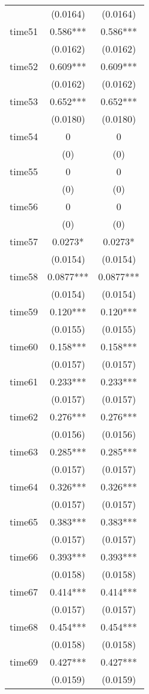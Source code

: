 \documentclass[]{article}
\begin{document}
\begin{tabular}{lcc}
 & (0.0164) & (0.0164) \\
time51 & 0.586*** & 0.586*** \\
 & (0.0162) & (0.0162) \\
time52 & 0.609*** & 0.609*** \\
 & (0.0162) & (0.0162) \\
time53 & 0.652*** & 0.652*** \\
 & (0.0180) & (0.0180) \\
time54 & 0 & 0 \\
 & (0) & (0) \\
time55 & 0 & 0 \\
 & (0) & (0) \\
time56 & 0 & 0 \\
 & (0) & (0) \\
time57 & 0.0273* & 0.0273* \\
 & (0.0154) & (0.0154) \\
time58 & 0.0877*** & 0.0877*** \\
 & (0.0154) & (0.0154) \\
time59 & 0.120*** & 0.120*** \\
 & (0.0155) & (0.0155) \\
time60 & 0.158*** & 0.158*** \\
 & (0.0157) & (0.0157) \\
time61 & 0.233*** & 0.233*** \\
 & (0.0157) & (0.0157) \\
time62 & 0.276*** & 0.276*** \\
 & (0.0156) & (0.0156) \\
time63 & 0.285*** & 0.285*** \\
 & (0.0157) & (0.0157) \\
time64 & 0.326*** & 0.326*** \\
 & (0.0157) & (0.0157) \\
time65 & 0.383*** & 0.383*** \\
 & (0.0157) & (0.0157) \\
time66 & 0.393*** & 0.393*** \\
 & (0.0158) & (0.0158) \\
time67 & 0.414*** & 0.414*** \\
 & (0.0157) & (0.0157) \\
time68 & 0.454*** & 0.454*** \\
 & (0.0158) & (0.0158) \\
time69 & 0.427*** & 0.427*** \\
 & (0.0159) & (0.0159) \\

\end{tabular}
\end{document}
